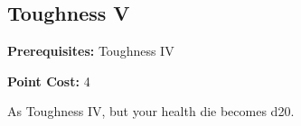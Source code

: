 \subsection{Toughness V}\label{feat:toughness5}

\noindent
\textbf{Prerequisites:} Toughness IV

\noindent
\textbf{Point Cost:} 4 

As Toughness IV, but your health die becomes d20.

